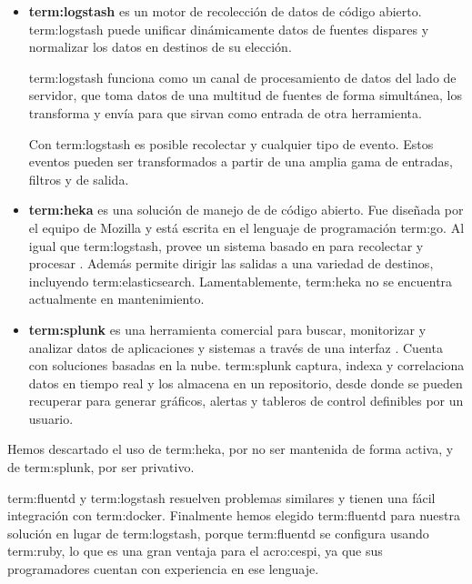 \begin{itemize}

\item
\textbf{\gls{term:logstash}} es un motor de recolección de datos de código abierto.
\gls{term:logstash} puede unificar dinámicamente datos de fuentes dispares y
normalizar los datos en destinos de su elección.

\gls{term:logstash} funciona como un canal de procesamiento de datos del lado
de servidor, que toma datos de una multitud de fuentes de forma simultánea, los
transforma y envía para que sirvan como entrada de otra herramienta.

Con \gls{term:logstash} es posible recolectar  y cualquier tipo de evento.
Estos eventos pueden ser transformados a partir de una amplia gama de entradas,
filtros y  de salida.

\item
\textbf{\gls{term:heka}} es una solución de manejo de  de código abierto. Fue
diseñada por el equipo de Mozilla y está escrita en el lenguaje de programación
\gls{term:go}. Al igual que \gls{term:logstash}, provee un sistema basado en
 para recolectar y procesar . Además permite dirigir las
salidas a una variedad de destinos, incluyendo \gls{term:elasticsearch}.
Lamentablemente, \gls{term:heka} no se encuentra actualmente en mantenimiento.

\item
\textbf{\gls{term:splunk}} es una herramienta comercial para buscar, monitorizar y
analizar datos de aplicaciones y sistemas a través de una interfaz
. Cuenta con soluciones basadas en la nube. \gls{term:splunk}
captura, indexa y correlaciona datos en tiempo real y los almacena en un
repositorio, desde donde se pueden recuperar para generar gráficos, alertas y
tableros de control definibles por un usuario.

\end{itemize}

Hemos descartado el uso de \gls{term:heka}, por no ser mantenida de forma
activa, y de \gls{term:splunk}, por ser  privativo.

\gls{term:fluentd} y \gls{term:logstash} resuelven problemas similares y tienen
una fácil integración con \gls{term:docker}. Finalmente hemos elegido
\gls{term:fluentd} para nuestra solución en lugar de \gls{term:logstash},
porque \gls{term:fluentd} se configura usando \gls{term:ruby}, lo que es una
gran ventaja para el \gls{acro:cespi}, ya que sus programadores cuentan con
experiencia en ese lenguaje.

